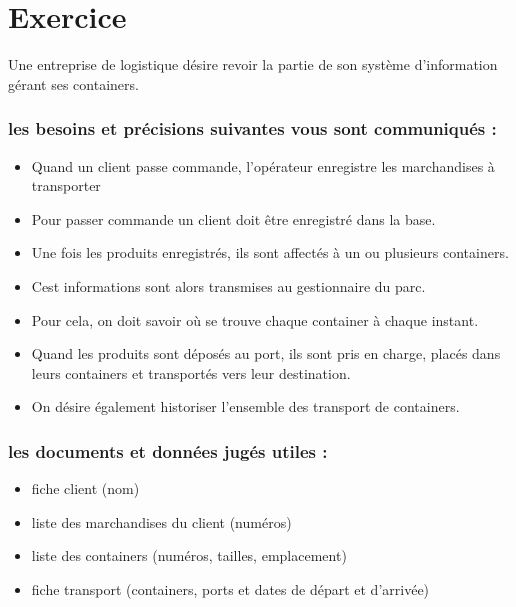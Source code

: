 \section*{Exercice}
Une entreprise de logistique désire revoir la partie de son système d'information gérant ses containers.

\subsubsection*{les besoins et précisions suivantes vous sont communiqués :}
\begin{itemize}
    \item Quand un client passe commande, l'opérateur enregistre les marchandises à transporter
    \item Pour passer commande un client doit être enregistré dans la base.
    \item Une fois les produits enregistrés, ils sont affectés à un ou plusieurs containers. 
    \item Cest informations sont alors transmises au gestionnaire du parc.
    \item Pour cela, on doit savoir où se trouve chaque container à chaque instant.
    \item Quand les produits sont déposés au port, ils sont pris en charge, placés dans leurs containers et transportés vers leur destination.
    \item On désire également historiser l'ensemble des transport de containers.
\end{itemize}

\subsubsection*{les documents et données jugés utiles :}
\begin{itemize}
    \item fiche client (nom)
    \item liste des marchandises du client (numéros)
    \item liste des containers (numéros, tailles, emplacement)
    \item fiche transport (containers, ports et dates de départ et d'arrivée)
\end{itemize}

